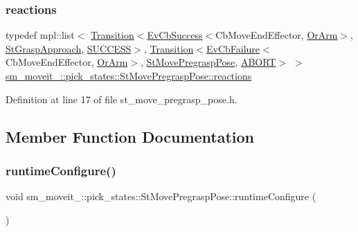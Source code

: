 \subsubsection{\texorpdfstring{reactions}{reactions}}
{\footnotesize\ttfamily typedef mpl\+::list$<$ \hyperlink{classsmacc_1_1Transition}{Transition}$<$\hyperlink{structsmacc_1_1EvCbSuccess}{Ev\+Cb\+Success}$<$Cb\+Move\+End\+Effector, \hyperlink{classsm__moveit__4_1_1OrArm}{Or\+Arm}$>$, \hyperlink{structsm__moveit__4_1_1pick__states_1_1StGraspApproach}{St\+Grasp\+Approach}, \hyperlink{structsmacc_1_1default__transition__tags_1_1SUCCESS}{S\+U\+C\+C\+E\+SS}$>$, \hyperlink{classsmacc_1_1Transition}{Transition}$<$\hyperlink{structsmacc_1_1EvCbFailure}{Ev\+Cb\+Failure}$<$Cb\+Move\+End\+Effector, \hyperlink{classsm__moveit__4_1_1OrArm}{Or\+Arm}$>$, \hyperlink{structsm__moveit__4_1_1pick__states_1_1StMovePregraspPose}{St\+Move\+Pregrasp\+Pose}, \hyperlink{structsmacc_1_1default__transition__tags_1_1ABORT}{A\+B\+O\+RT}$>$ $>$ \hyperlink{structsm__moveit__4_1_1pick__states_1_1StMovePregraspPose_ac50bbd9fc0cba7d84e41443e4ddda17d}{sm\+\_\+moveit\+\_\+::pick\+\_\+states\+::\+St\+Move\+Pregrasp\+Pose\+::reactions}}



Definition at line 17 of file st\+\_\+move\+\_\+pregrasp\+\_\+pose.\+h.



\subsection{Member Function Documentation}
\mbox{\label{structsm__moveit__4_1_1pick__states_1_1StMovePregraspPose_ae9ffdf77d89169b5f4fb2cb2fadd56fc}} 
\subsubsection{\texorpdfstring{runtime\+Configure()}{runtimeConfigure()}}
{\footnotesize\ttfamily void sm\+\_\+moveit\+\_\+::pick\+\_\+states\+::\+St\+Move\+Pregrasp\+Pose\+::runtime\+Configure (\begin{DoxyParamCaption}{ }\end{DoxyParamCaption})\hspace{0.3cm}{\ttfamily [inline]}}



